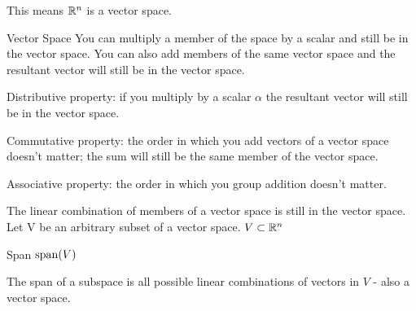 \documentclass[11pt]{article}
\begin{document}
This means $\mathbb R^n$ is a vector space.




\begin{definition}{Vector Space}
You can multiply a member of the space by a scalar and still be in the vector space.
You can also add members of the same vector space and the resultant vector will still be in the vector space.

Distributive property: if you multiply by a scalar $\alpha$ the resultant vector will still be in the vector space.

Commutative property: the order in which you add vectors of a vector space doesn't matter; the sum will still be the same member of the vector space.

Associative property: the order in which you group addition doesn't matter.
\end{definition}

The linear combination of members of a vector space is still in the vector space.
Let V be an arbitrary subset of a vector space.
$V \subset \mathbb{R}^n$

\begin{definition}{Span}
  $\operatorname{span}(V)$

  The span of a subspace is all possible linear combinations of vectors in $V$ - also a vector space.
\end{definition}
\end{document}
